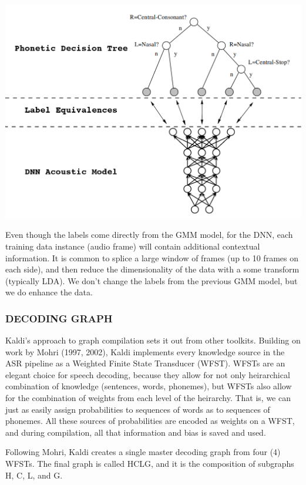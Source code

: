 \documentclass[10pt,a4paper]{article}
\begin{document}
\begin{center}
  \includegraphics[width=.9\textwidth,keepaspectratio]{figs/tree-net.png}
\end{center}



Even though the labels come directly from the GMM model, for the DNN, each training data instance (audio frame) will contain additional contextual information. It is common to splice a large window of frames (up to 10 frames on each side), and then reduce the dimensionality of the data with a some transform (typically LDA). We don't change the labels from the previous GMM model, but we do enhance the data.

    

\subsubsection*{DECODING GRAPH}

Kaldi's approach to graph compilation sets it out from other toolkits. Building on work by Mohri (1997, 2002), Kaldi implements every knowledge source in the ASR pipeline as a Weighted Finite State Transducer (WFST). WFSTs are an elegant choice for speech decoding, because they allow for not only heirarchical combination of knowledge (sentences, words, phonemes), but WFSTs also allow for the combination of weights from each level of the heirarchy. That is, we can just as easily assign probabilities to sequences of words as to sequences of phonemes. All these sources of probabilities are encoded as weights on a WFST, and during compilation, all that information and bias is saved and used.

Following Mohri, Kaldi creates a single master decoding graph from four (4) WFSTs. The final graph is called HCLG, and it is the composition of subgraphs H, C, L, and G.
\end{document}
